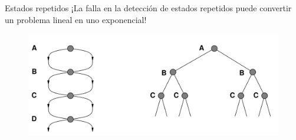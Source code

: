 \begin{frame}{Estados repetidos}
¡La falla en la detección de estados repetidos puede convertir un problema lineal en
uno exponencial!

    \begin{figure}
        \includegraphics[scale=0.25]{72_chap3_pag72.png}
    \end{figure}
\end{frame}{}

